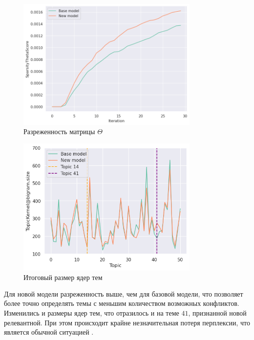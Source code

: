 \documentclass{article}
\begin{document}
\begin{figure}[h]
\includegraphics[width=9cm]{figures/sparsity_theta.png}
\centering
\caption{Разреженность матрицы $\Theta$}
\end{figure}

\begin{figure}[h]
\includegraphics[width=9cm]
{figures/topickernel_bigram_size.png}
\centering
\caption{Итоговый размер ядер тем}
\end{figure}

Для новой модели разреженность выше, чем для базовой модели, что позволяет более точно определять темы с меньшим количеством возможных конфликтов. Изменились и размеры ядер тем, что отразилось и на теме $41$, признанной новой релевантной. При этом происходит крайне незначительная потеря перплексии, что является обычной ситуацией \citep{artm2}.



\end{document}

